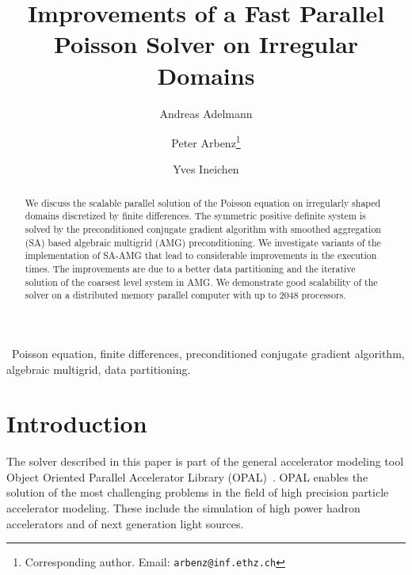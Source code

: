 \documentclass[oribibl]{llncs}
\begin{document}
\title{Improvements of a Fast Parallel Poisson Solver on Irregular
  Domains}

\frontmatter

\pagestyle{plain}

\author{Andreas Adelmann
  \and
  Peter Arbenz\thanks{Corresponding author.
    Email: \texttt{arbenz@inf.ethz.ch}}
  \and
  Yves Ineichen
}


\maketitle

\begin{abstract}
  We discuss the scalable parallel solution of the Poisson equation on
  irregularly shaped domains discretized by finite differences.  The
  symmetric positive definite system is solved by the preconditioned
  conjugate gradient algorithm with smoothed aggregation (SA) based
  algebraic multigrid (AMG) preconditioning.  We investigate variants of
  the implementation of SA-AMG that lead to considerable improvements in
  the execution times.  The improvements are due to a better data
  partitioning and the iterative solution of the coarsest level system
  in AMG.  We demonstrate good scalability of the solver on a
  distributed memory parallel computer with up to 2048 processors.

\end{abstract}

\keywordname\ Poisson equation, finite differences, preconditioned
conjugate gradient algorithm, algebraic multigrid, data partitioning.

\section{Introduction}
\label{sec:intro}

The solver described in this paper is part of the general accelerator
modeling tool Object Oriented Parallel Accelerator Library
(OPAL)~\cite{opal}.  OPAL enables the solution of the most challenging
problems in the field of high precision particle accelerator modeling.
These include the simulation of high power hadron accelerators and of
next generation light sources.
\end{document}
